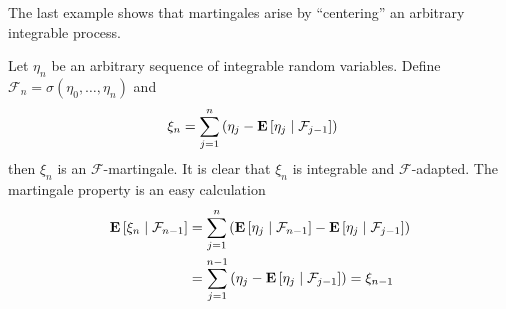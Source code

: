 The last example shows that martingales arise by ``centering'' an arbitrary integrable 
process.
\begin{examp}\label{CenteringAsMartingale}Let $\eta_n$ be an arbitrary sequence of integrable random variables.  Define $\mathcal{F}_n = \sigma(\eta_0, \dotsc, \eta_n)$
and 
\begin{align*}
\xi_n &= 
\sum_{j=1}^n \left( \eta_j - \cexpectationlong{\mathcal{F}_{j-1}}{\eta_j} \right)
\end{align*}
then $\xi_n$ is an $\mathcal{F}$-martingale.  It is clear that $\xi_n$ is integrable
and $\mathcal{F}$-adapted.  The martingale property is an easy calculation
\begin{align*}
\cexpectationlong{\mathcal{F}_{n-1}}{\xi_n} &= 
\sum_{j=1}^n \left(\cexpectationlong{\mathcal{F}_{n-1}}{\eta_j} - \cexpectationlong{\mathcal{F}_{j-1}}{\eta_j} \right ) \\
&= \sum_{j=1}^{n-1} \left ( \eta_j - \cexpectationlong{\mathcal{F}_{j-1}}{\eta_j} \right ) = \xi_{n-1}
\end{align*}
\end{examp}


